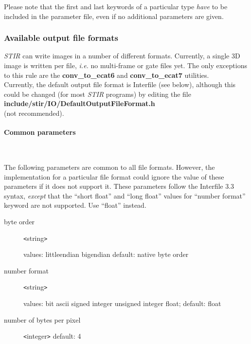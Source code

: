 \documentclass{article}
\newcommand{\subsubsubsection}[1]{\paragraph{#1}\mbox{} \\}
\begin{document}
{{Please note that the first and last keywords of a particular 
type \textit{have} to be included in the parameter file, even if no 
additional parameters are given.


\subsubsection{
Available output file formats}
\label{sec:outputfileformats}

\textit{STIR} can write images in a number of different formats. Currently, 
a single 3D image is written per file, \textit{i.e.} no multi-frame 
or gate files yet. The only exceptions to this rule are the \textbf{conv\_to\_ecat6} 
and \textbf{conv\_to\_ecat7} utilities.\\
Currently, the default output file format is Interfile (see below), 
although this could be changed (for most \textit{STIR} programs) by 
editing the file\\
 \textbf{include/stir/IO/DefaultOutputFileFormat.h}\\ 
(not recommended).

{ \subsubsubsection{Common parameters}
}
\label{ref:outputcommonparameters}
The following parameters are common to all file formats. However, 
the implementation for a particular file format could ignore 
the value of these parameters if it does not support it. These 
parameters follow the Interfile 3.3 syntax, \textit{except} that the 
``short float'' and ``long float'' values for ``number format'' 
keyword are not supported. Use ``float'' instead.


\begin{description}
\item[byte order] \texttt{<}string\texttt{>}\linebreak
\raggedright
 values: littleendian {\textbar} bigendian\linebreak
 default: native byte order

\item[number format] \texttt{<}string\texttt{>}\linebreak
\raggedright
 values: bit {\textbar} ascii 
{\textbar} signed integer {\textbar} 
 unsigned integer {\textbar} float;\linebreak
default: float
\item[number of bytes per pixel] \texttt{<}integer\texttt{>}\linebreak
 default: 4
\end{description}


}}
\end{document}
